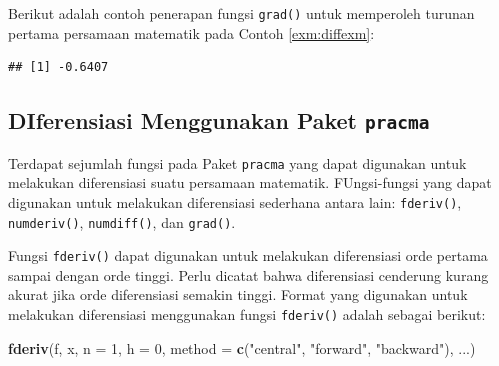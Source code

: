 \documentclass[]{book}
\newenvironment{Shaded}{\begin{snugshade}}{\end{snugshade}}
\newcommand{\ControlFlowTok}[1]{\textcolor[rgb]{0.13,0.29,0.53}{\textbf{#1}}}
\newcommand{\DataTypeTok}[1]{\textcolor[rgb]{0.13,0.29,0.53}{#1}}
\newcommand{\DecValTok}[1]{\textcolor[rgb]{0.00,0.00,0.81}{#1}}
\newcommand{\KeywordTok}[1]{\textcolor[rgb]{0.13,0.29,0.53}{\textbf{#1}}}
\newcommand{\NormalTok}[1]{#1}
\newcommand{\OperatorTok}[1]{\textcolor[rgb]{0.81,0.36,0.00}{\textbf{#1}}}
\newcommand{\StringTok}[1]{\textcolor[rgb]{0.31,0.60,0.02}{#1}}
\theoremstyle{definition}
\theoremstyle{definition}
\theoremstyle{definition}
\theoremstyle{remark}
\begin{document}
Berikut adalah contoh penerapan fungsi \texttt{grad()} untuk memperoleh turunan pertama persamaan matematik pada Contoh \ref{exm:diffexm}:

\begin{Shaded}
\end{Shaded}

\begin{verbatim}
## [1] -0.6407
\end{verbatim}

\hypertarget{diferensiasi-menggunakan-paket-pracma}{%
\subsection{\texorpdfstring{DIferensiasi Menggunakan Paket \texttt{pracma}}{DIferensiasi Menggunakan Paket pracma}}\label{diferensiasi-menggunakan-paket-pracma}}

Terdapat sejumlah fungsi pada Paket \texttt{pracma} yang dapat digunakan untuk melakukan diferensiasi suatu persamaan matematik. FUngsi-fungsi yang dapat digunakan untuk melakukan diferensiasi sederhana antara lain: \texttt{fderiv()}, \texttt{numderiv()}, \texttt{numdiff()}, dan \texttt{grad()}.

Fungsi \texttt{fderiv()} dapat digunakan untuk melakukan diferensiasi orde pertama sampai dengan orde tinggi. Perlu dicatat bahwa diferensiasi cenderung kurang akurat jika orde diferensiasi semakin tinggi. Format yang digunakan untuk melakukan diferensiasi menggunakan fungsi \texttt{fderiv()} adalah sebagai berikut:

\begin{Shaded}
\begin{Highlighting}[]
\KeywordTok{fderiv}\NormalTok{(f, x, }\DataTypeTok{n =} \DecValTok{1}\NormalTok{, }\DataTypeTok{h =} \DecValTok{0}\NormalTok{,}
        \DataTypeTok{method =} \KeywordTok{c}\NormalTok{(}\StringTok{"central"}\NormalTok{, }\StringTok{"forward"}\NormalTok{, }\StringTok{"backward"}\NormalTok{), }
\NormalTok{       ...)}
\end{Highlighting}
\end{Shaded}
\end{document}
